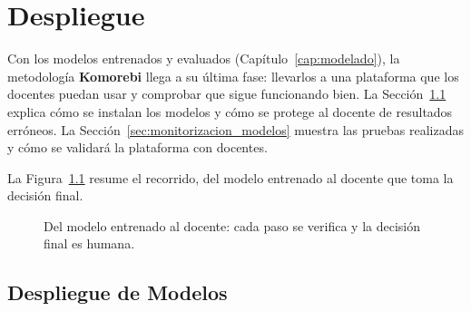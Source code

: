 \chapter{Despliegue}
\label{cap:despliegue}

Con los modelos entrenados y evaluados (Capítulo~\ref{cap:modelado}), la metodología \textbf{Komorebi} \cite{verges_como_2023} llega a su última fase: llevarlos a una plataforma que los docentes puedan usar y comprobar que sigue funcionando bien. La Sección~\ref{sec:despliegue_modelos} explica cómo se instalan los modelos y cómo se protege al docente de resultados erróneos. La Sección~\ref{sec:monitorizacion_modelos} muestra las pruebas realizadas y cómo se validará la plataforma con docentes.

La Figura~\ref{fig:panorama_despliegue} resume el recorrido, del modelo entrenado al docente que toma la decisión final.

\begin{figure}[H]
    \centering
    \caption{Del modelo entrenado al docente: cada paso se verifica y la decisión final es humana.}
    \label{fig:panorama_despliegue}
\end{figure}

\section{Despliegue de Modelos}
\label{sec:despliegue_modelos}

